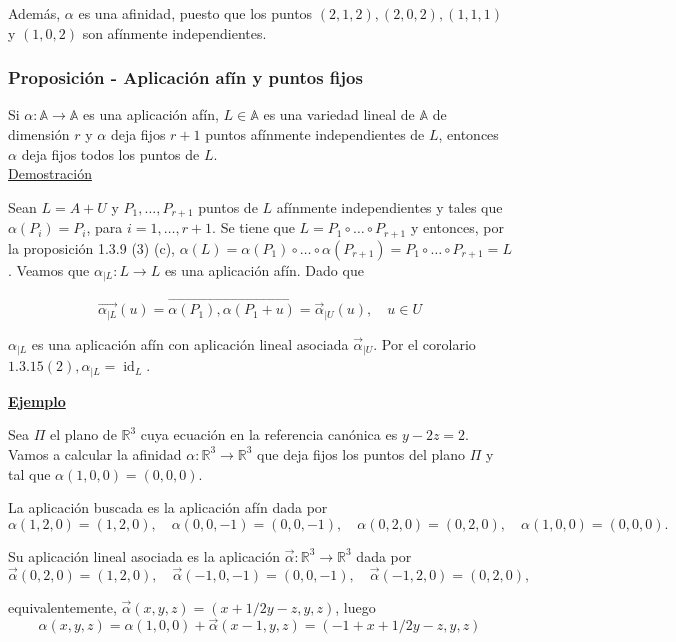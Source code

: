 \documentclass[12pt, a4paper, ones, notitlepage, openany,titlepage]{article}
\newcommand{\demostracion}{\noindent\underline{Demostración}}
\newcommand{\ejemplo}{\noindent\underline{\textbf{Ejemplo}}}
\begin{document}
Además, $\alpha$ es una afinidad, puesto que los puntos $(2,1,2),(2,0,2),(1,1,1)$ y $(1,0,2)$ son afínmente independientes.

\subsubsection{Proposición - Aplicación afín y puntos fijos}
Si $\alpha: \mathbb{A} \rightarrow \mathbb{A}$ es una aplicación afín, $L\in\mathbb{A}$ es una variedad lineal de $\mathbb{A}$ de dimensión $r$ y $\alpha$ deja fijos $r+1$ puntos afínmente independientes de $L$, entonces $\alpha$ deja fijos todos los puntos de $L$.\\

\demostracion

Sean $L=A+U$ y $P_{1}, \ldots, P_{r+1}$ puntos de $L$ afínmente independientes y tales que $\alpha\left(P_{i}\right)=P_{i}$, para $i=1, \ldots, r+1$. Se tiene que $L=P_{1} \circ \ldots \circ P_{r+1}$ y entonces, por la proposición 1.3.9 (3) (c), $\alpha(L)=\alpha\left(P_{1}\right) \circ \ldots \circ \alpha\left(P_{r+1}\right)=P_{1} \circ \ldots \circ P_{r+1}=L$. Veamos que $\alpha_{\mid L}: L \rightarrow L$ es una aplicación afín. Dado que

$$
\overrightarrow{\alpha_{\mid L}}(u)=\overrightarrow{\alpha\left(P_{1}\right), \alpha\left(P_{1}+u\right)}=\overrightarrow{\alpha}_{\mid U}(u), \quad u \in U
$$

$\alpha_{\mid L}$ es una aplicación afín con aplicación lineal asociada $\overrightarrow{\alpha}_{\mid U}$. Por el corolario $1.3 .15(2), \alpha_{\mid L}=\operatorname{id}_{L}$.

\ejemplo

Sea $\Pi$ el plano de $\mathbb{R}^{3}$ cuya ecuación en la referencia canónica es $y-2 z=2$. Vamos a calcular la afinidad $\alpha: \mathbb{R}^{3} \rightarrow \mathbb{R}^{3}$ que deja fijos los puntos del plano $\Pi$ y tal que $\alpha(1,0,0)=(0,0,0)$.

\noindent La aplicación buscada es la aplicación afín dada por
$$
\alpha(1,2,0)=(1,2,0), \quad \alpha(0,0,-1)=(0,0,-1), \quad \alpha(0,2,0)=(0,2,0), \quad \alpha(1,0,0)=(0,0,0) .
$$

\noindent Su aplicación lineal asociada es la aplicación $\overrightarrow{\alpha}: \mathbb{R}^{3} \rightarrow \mathbb{R}^{3}$ dada por
$$
\overrightarrow{\alpha}(0,2,0)=(1,2,0), \quad \overrightarrow{\alpha}(-1,0,-1)=(0,0,-1), \quad \overrightarrow{\alpha}(-1,2,0)=(0,2,0),
$$

\noindent equivalentemente, $\overrightarrow{\alpha}(x, y, z)=(x+1 / 2 y-z, y, z)$, luego
$$
\alpha(x, y, z)=\alpha(1,0,0)+\overrightarrow{\alpha}(x-1, y, z)=(-1+x+1 / 2 y-z, y, z)
$$
\end{document}
